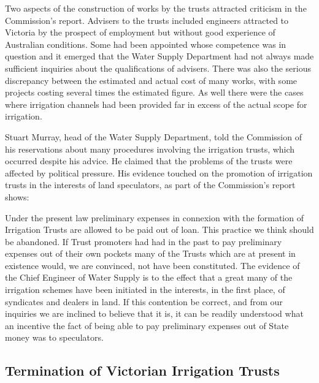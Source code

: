 Two aspects of the construction of works by the trusts attracted
criticism in the Commission's report.  Advisers to the trusts included
engineers attracted to Victoria by the prospect of employment but
without good experience of Australian conditions.  Some had been
appointed whose competence was in question and it emerged that the
Water Supply Department had not always made sufficient inquiries about
the qualifications of advisers.  There was also the serious
discrepancy between the estimated and actual cost of many works, with
some projects costing several times the estimated figure.  As well
there were the cases where irrigation channels had been provided far
in excess of the actual scope for irrigation.

Stuart Murray, head of the Water Supply Department, told the
Commission of his reservations about many procedures involving the
irrigation trusts, which occurred despite his advice.  He claimed that
the problems of the trusts were affected by political pressure.  His
evidence touched on the promotion of irrigation trusts in the
interests of land speculators, as part of the Commission's report
shows:
\begin{Quote}
	Under the present law preliminary expenses in connexion with
	the formation of Irrigation Trusts are allowed to be paid out
	of loan.  This practice we think should be abandoned.  If
	Trust promoters had had in the past to pay preliminary
	expenses out of their own pockets many of the Trusts which are
	at present in existence would, we are convinced, not have been
	constituted.  The evidence of the Chief Engineer of Water
	Supply is to the effect that a great many of the irrigation
	schemes have been initiated in the interests, in the first
	place, of syndicates and dealers in land.  If this contention
	be correct, and from our inquiries we are inclined to believe
	that it is, it can be readily understood what an incentive the
	fact of being able to pay preliminary expenses out of State
	money was to speculators.
\end{Quote}

\subsection*{Termination of Victorian Irrigation Trusts}


